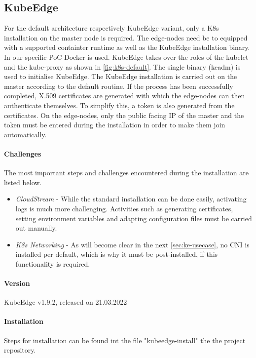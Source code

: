 \documentclass[MIC,Master,english]{twbook}%
\begin{document}
\subsection{KubeEdge}
\label{sec:dsrenvke}
For the default architecture respectively KubeEdge variant, only a \ac{K8s} installation on the master node is required. The edge-nodes need be to equipped with a supported containter runtime as well as the KubeEdge installation binary. In our specific \ac{PoC} Docker is used. KubeEdge takes over the roles of the kubelet and the kube-proxy as shown in \autoref{fig:k8s-default}. The single binary (keadm) is used to initialise KubeEdge. The KubeEdge installation is carried out on the master according to the default routine. If the process has been successfully completed, X.509 certificates are generated with which the edge-nodes can then authenticate themselves. To simplify this, a token is also generated from the certificates. On the edge-nodes, only the public facing \ac{IP} of the master and the token must be entered during the installation in order to make them join automatically.

\paragraph{Challenges} The most important steps and challenges encountered during the installation are listed below.

\begin{itemize}
    \item \textit{CloudStream} - While the standard installation can be done easily, activating logs is much more challenging. Activities such as generating certificates, setting environment variables and adapting configuration files must be carried out manually.
    \item \textit{K8s Networking} - As will become clear in the next \autoref{sec:ke-usecase}, no \ac{CNI} is installed per default, which is why it must be post-installed, if this functionality is required. 
\end{itemize}

\paragraph{Version} KubeEdge v1.9.2, released on 21.03.2022

\paragraph{Installation} Steps for installation can be found int the file "kubeedge-install"\cite{bk-gh-ke-install} the the project repository.
\end{document}
